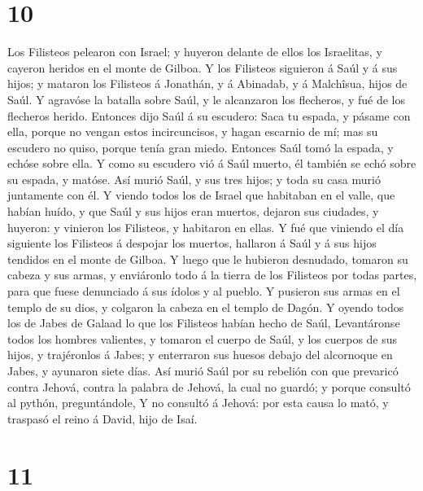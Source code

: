 \hypertarget{section-9}{%
\section{10}\label{section-9}}

 Los Filisteos pelearon con Israel; y huyeron delante de
ellos los Israelitas, y cayeron heridos en el monte de Gilboa.
 Y los Filisteos siguieron á Saúl y á sus hijos; y mataron
los Filisteos á Jonathán, y á Abinadab, y á Malchîsua, hijos de Saúl.
 Y agravóse la batalla sobre Saúl, y le alcanzaron los
flecheros, y fué de los flecheros herido.  Entonces dijo
Saúl á su escudero: Saca tu espada, y pásame con ella, porque no vengan
estos incircuncisos, y hagan escarnio de mí; mas su escudero no quiso,
porque tenía gran miedo. Entonces Saúl tomó la espada, y echóse sobre
ella.  Y como su escudero vió á Saúl muerto, él también se
echó sobre su espada, y matóse.  Así murió Saúl, y sus
tres hijos; y toda su casa murió juntamente con él.  Y
viendo todos los de Israel que habitaban en el valle, que habían huído,
y que Saúl y sus hijos eran muertos, dejaron sus ciudades, y huyeron: y
vinieron los Filisteos, y habitaron en ellas.  Y fué que
viniendo el día siguiente los Filisteos á despojar los muertos, hallaron
á Saúl y á sus hijos tendidos en el monte de Gilboa.  Y
luego que le hubieron desnudado, tomaron su cabeza y sus armas, y
enviáronlo todo á la tierra de los Filisteos por todas partes, para que
fuese denunciado á sus ídolos y al pueblo.  Y pusieron
sus armas en el templo de su dios, y colgaron la cabeza en el templo de
Dagón.  Y oyendo todos los de Jabes de Galaad lo que los
Filisteos habían hecho de Saúl,  Levantáronse todos los
hombres valientes, y tomaron el cuerpo de Saúl, y los cuerpos de sus
hijos, y trajéronlos á Jabes; y enterraron sus huesos debajo del
alcornoque en Jabes, y ayunaron siete días.  Así murió
Saúl por su rebelión con que prevaricó contra Jehová, contra la palabra
de Jehová, la cual no guardó; y porque consultó al pythón,
preguntándole,  Y no consultó á Jehová: por esta causa lo
mató, y traspasó el reino á David, hijo de Isaí.

\hypertarget{section-10}{%
\section{11}\label{section-10}}

